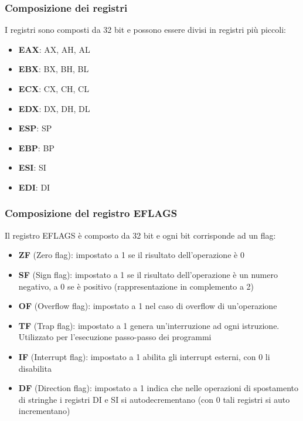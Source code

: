 \documentclass[a4paper]{article}
\theoremstyle{break}
\theoremstyle{break}
\theoremstyle{break}
\theoremstyle{break}
\begin{document}
\subsubsection{Composizione dei registri}
I registri sono composti da 32 bit e possono essere divisi in registri più piccoli:
\begin{itemize}
	\item \textbf{EAX}: AX, AH, AL
	\item \textbf{EBX}: BX, BH, BL
	\item \textbf{ECX}: CX, CH, CL
	\item \textbf{EDX}: DX, DH, DL
	\item \textbf{ESP}: SP
	\item \textbf{EBP}: BP
	\item \textbf{ESI}: SI
	\item \textbf{EDI}: DI
\end{itemize}

\subsubsection{Composizione del registro EFLAGS}
Il registro EFLAGS è composto da 32 bit e ogni bit corrisponde ad un flag:
\begin{itemize}
	\item \textbf{ZF} (Zero flag):  impostato a 1 se il risultato dell'operazione è 0
	\item \textbf{SF} (Sign flag): impostato a 1 se il risultato dell'operazione è un
	      numero negativo, a 0 se è positivo (rappresentazione in complemento
	      a 2)
	\item \textbf{OF} (Overflow flag): impostato a 1 nel caso di overflow di
	      un'operazione
	\item \textbf{TF} (Trap flag): impostato a 1 genera un'interruzione ad ogni
	      istruzione. Utilizzato per l'esecuzione passo-passo dei programmi
	\item \textbf{IF} (Interrupt flag): impostato a 1 abilita gli interrupt esterni, con 0 li
	      disabilita
	\item \textbf{DF} (Direction flag): impostato a 1 indica che nelle operazioni di
	      spostamento di stringhe i registri DI e SI si autodecrementano (con 0
	      tali registri si auto incrementano)
\end{itemize}
\end{document}
